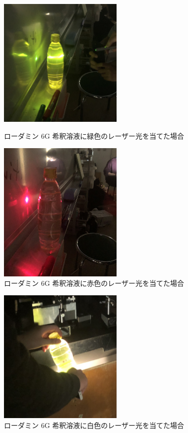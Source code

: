 \documentclass[uplatex,dvipdfmx,a4paper,11pt]{jlreq}
\numberwithin{equation}{section}
\theoremstyle{definition}
\begin{document}
\begin{figure}[htbp]
  \begin{minipage}[b]{0.5\linewidth}
    \centering
    \includegraphics[width=6cm]{./assets/green.jpg}
    \caption{ローダミン 6G 希釈溶液に緑色のレーザー光を当てた場合}
    \label{green}
  \end{minipage}
  \begin{minipage}[b]{0.5\linewidth}
    \centering
    \includegraphics[width=6cm]{./assets/red.jpg}
    \caption{ローダミン 6G 希釈溶液に赤色のレーザー光を当てた場合}
    \label{red}
  \end{minipage}
\end{figure}
\begin{figure}[htbp]
  \centering
  \includegraphics[width=6cm]{./assets/white.jpg}
  \caption{ローダミン 6G 希釈溶液に白色のレーザー光を当てた場合}
  \label{white}
\end{figure}
\end{document}
